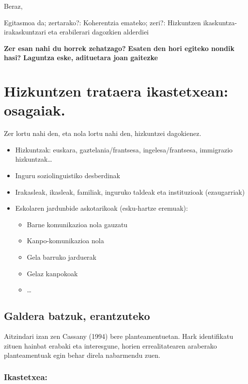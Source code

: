 \documentclass[
]{book}
\providecommand{\tightlist}{%
  \setlength{\itemsep}{0pt}\setlength{\parskip}{0pt}}
\begin{document}
Beraz,

Egitasmoa da; zertarako?:
Koherentzia emateko;
zeri?:
Hizkuntzen ikaskuntza-irakaskuntzari eta erabilerari dagozkien alderdiei

\textbf{Zer esan nahi du horrek zehatzago?}
\textbf{Esaten den hori egiteko nondik hasi?}
\textbf{Laguntza eske, adituetara joan gaitezke}

\hypertarget{hizkuntzen-trataera-ikastetxean-osagaiak.}{%
\section{Hizkuntzen trataera ikastetxean: osagaiak.}\label{hizkuntzen-trataera-ikastetxean-osagaiak.}}

Zer lortu nahi den, eta nola lortu nahi den, hizkuntzei dagokienez.

\begin{itemize}
\tightlist
\item
  Hizkuntzak: euskara, gaztelania/frantsesa, ingelesa/frantsesa, immigrazio hizkuntzak\ldots{}
\item
  Inguru soziolinguistiko desberdinak
\item
  Irakasleak, ikasleak, familiak, inguruko taldeak eta instituzioak (ezaugarriak)
\item
  Eskolaren jardunbide askotarikoak (esku-hartze eremuak):

  \begin{itemize}
  \tightlist
  \item
    Barne komunikazioa nola gauzatu
  \item
    Kanpo-komunikazioa nola
  \item
    Gela barruko jarduerak
  \item
    Gelaz kanpokoak
  \item
    \ldots{}
  \end{itemize}
\end{itemize}

\hypertarget{galdera-batzuk-erantzuteko}{%
\subsection{Galdera batzuk, erantzuteko}\label{galdera-batzuk-erantzuteko}}

Aitzindari izan zen Cassany (1994) bere planteamentuetan. Hark identifikatu zituen hainbat erabaki eta interesgune, horien errealitatearen araberako planteamentuak egin behar direla nabarmendu zuen.

\hypertarget{ikastetxea}{%
\subsubsection*{Ikastetxea:}\label{ikastetxea}}
\end{document}
